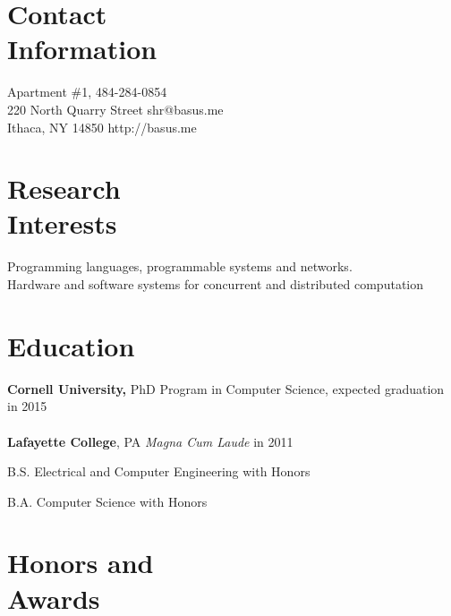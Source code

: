 \documentclass[margin,line]{resume}
\begin{document}

\begin{resume}


    \section{Contact\\Information}

    Apartment \#1,                          \hfill 484-284-0854          \\
    220 North Quarry Street                 \hfill shr@basus.me          \\
    Ithaca, NY 14850                        \hfill http://basus.me

    \section{Research\\Interests}

    Programming languages, programmable systems and networks. \\
    Hardware and software systems for concurrent and distributed computation

    \section{Education}

    {\bf Cornell University,} PhD Program in Computer Science,
    expected graduation in 2015 \\
    \\
    {\bf Lafayette College}, PA \emph{Magna Cum Laude} in 2011%
    \begin{list2}
        \item B.S. Electrical and Computer Engineering with Honors
        \item B.A. Computer Science with Honors
    \end{list2}
    \section{Honors and\\Awards}


\end{resume}
\end{document}
